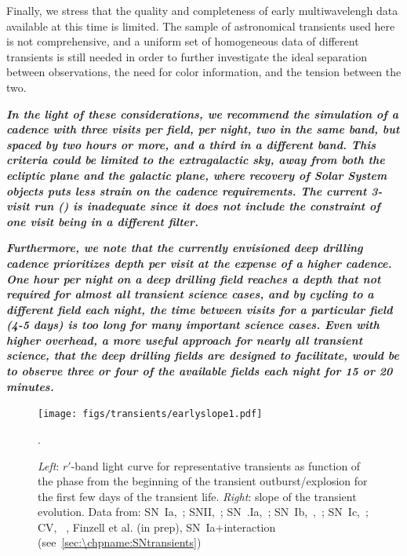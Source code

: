 Finally, we stress that the quality and completeness of early
multiwavelengh data available at this time is limited. The sample of
astronomical transients used here is not comprehensive, and a uniform
set of homogeneous data of different transients is still needed in
order to further investigate the ideal separation between
observations, the need for color information, and the tension between
the two.

{\bf\emph{In the light of these considerations, we recommend the
    simulation of a cadence with three visits per field, per night,
    two in the same band, but spaced by two hours or more, and a third
    in a different band. This criteria could be limited to the
    extragalactic sky, away from both the ecliptic plane and the
    galactic plane, where recovery of Solar System objects puts less
    strain on the cadence requirements.  The current 3-visit \OpSim run
    () is inadequate since it
    does not include the constraint of one visit being in a different
    filter.}}

{\bf\emph{Furthermore, we note that the currently envisioned deep
    drilling cadence prioritizes depth per visit at the expense of a
    higher cadence. One hour per night on a deep drilling field
    reaches a depth that not required for almost all transient science
    cases, and by cycling to a different field each night, the time
    between visits for a particular field (4-5 days) is too long for
    many important science cases. Even with higher overhead, a more
    useful approach for nearly all transient science, that the deep
    drilling fields are designed to facilitate, would be to observe
    three or four of the available fields each night for 15 or 20
    minutes.}}

\begin{figure}[hbt]
\centerline{
\texttt{[image: figs/transients/earlyslope1.pdf]}
}
\caption{\emph{Left}: $r'$-band light curve for representative transients as function of the phase from the beginning of the transient outburst/explosion for the first few days of the transient life. \emph{Right}: slope of the transient evolution. Data from: SN~Ia,~\citet{Olling15}; SNII,~\citet{Rubin16}; SN~.Ia,~\citet{Shen10}; SN~Ib,~\citet{Valenti11},~\citet{Cao13}; SN~Ic,~\citet{Mazzali02}; CV, ~\citet{Sokoloski13}, Finzell et al. (in prep), SN~Ia+interaction (see~\autoref{sec:\chpname:SNtransients})}.
\label{fig:earlyslope}
\end{figure}

